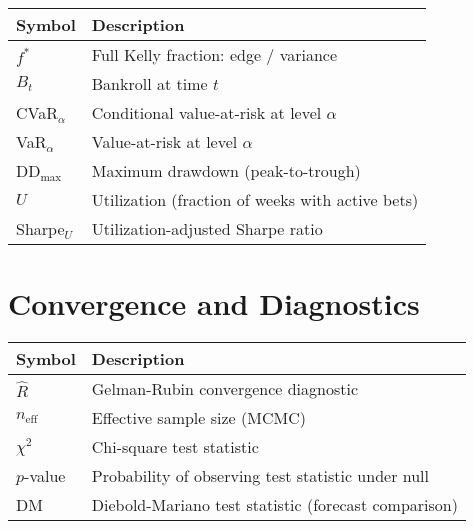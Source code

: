 \begin{tabular}{ll}
\toprule
\textbf{Symbol}  & \textbf{Description} \\
\midrule
$f^*$ & Full Kelly fraction: edge / variance \\
$B_t$ & Bankroll at time $t$ \\
CVaR$_\alpha$ & Conditional value-at-risk at level $\alpha$ \\
VaR$_\alpha$ & Value-at-risk at level $\alpha$ \\
DD$_{\max}$ & Maximum drawdown (peak-to-trough) \\
$U$ & Utilization (fraction of weeks with active bets) \\
Sharpe$_U$ & Utilization-adjusted Sharpe ratio \\
\bottomrule
\end{tabular}

\section*{Convergence and Diagnostics}

\begin{tabular}{ll}
\toprule
\textbf{Symbol}  & \textbf{Description} \\
\midrule
$\hat{R}$ & Gelman-Rubin convergence diagnostic \\
$n_{\text{eff}}$ & Effective sample size (MCMC) \\
$\chi^2$ & Chi-square test statistic \\
$p$-value & Probability of observing test statistic under null \\
DM & Diebold-Mariano test statistic (forecast comparison) \\
\bottomrule
\end{tabular}